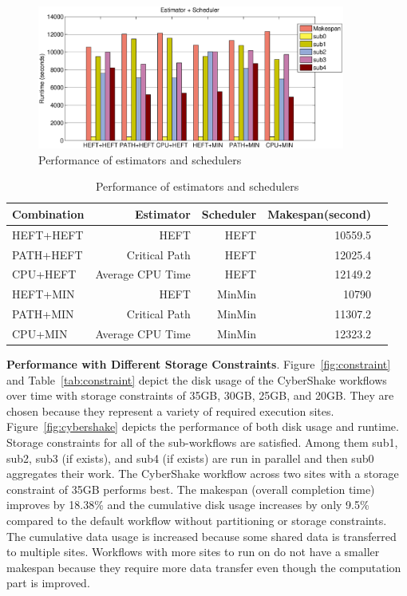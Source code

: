 \begin{figure}[h!]
	\centering
    \includegraphics[width=0.9\textwidth]{figures/partitioning/estimator.eps}
    \caption{Performance of estimators and schedulers}
    \label{fig:scheduler}
\end{figure}

\begin{table}[h!]
\caption{Performance of estimators and schedulers}
\label{tab:scheduler}
\centering
\begin{tabular}{lrrrr}
\hline
Combination     &     Estimator &     Scheduler &    Makespan(second)  \\
\hline
HEFT+HEFT & HEFT & HEFT & 10559.5\\
PATH+HEFT & Critical Path & HEFT & 12025.4\\
CPU+HEFT & Average CPU Time & HEFT & 12149.2\\
HEFT+MIN & HEFT & MinMin & 10790 \\
PATH+MIN & Critical Path & MinMin & 11307.2 \\
CPU+MIN & Average CPU Time & MinMin & 12323.2\\
\hline
\end{tabular}
\end{table} 

\textbf{Performance with Different Storage Constraints}. Figure~\ref{fig:constraint} and Table~\ref{tab:constraint} depict the disk usage of the CyberShake workflows over time with storage constraints of 35GB, 30GB, 25GB, and 20GB. They are chosen because they represent a variety of required execution sites. Figure~\ref{fig:cybershake} depicts the performance of both disk usage and runtime. Storage constraints for all of the sub-workflows are satisfied. Among them sub1, sub2, sub3 (if exists), and sub4 (if exists) are run in parallel and then sub0 aggregates their work. The CyberShake workflow across two sites with a storage constraint of 35GB performs best. The makespan (overall completion time) improves by 18.38\% and the cumulative disk usage increases by only 9.5\% compared to the default workflow without partitioning or storage constraints. The cumulative data usage is increased because some shared data is transferred to multiple sites. Workflows with more sites to run on do not have a smaller makespan because they require more data transfer even though the computation part is improved. 

